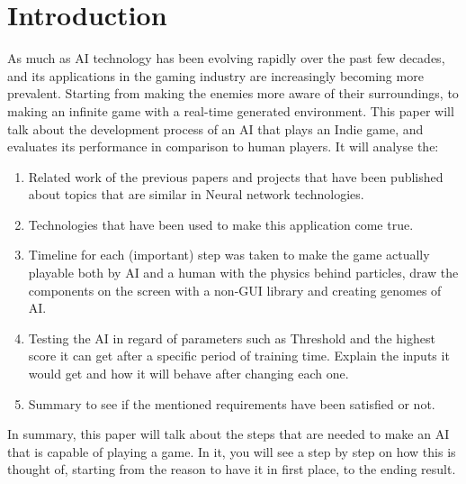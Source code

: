 \chapter{Introduction}
As much as AI technology has been evolving rapidly over the past few decades, and its applications in the gaming industry are increasingly becoming more prevalent. Starting from making the enemies more aware of their surroundings, to making an infinite game with a real-time generated environment. This paper will talk about the development process of an AI that plays an Indie game, and evaluates its performance in comparison to human players. It will analyse the:

\begin{enumerate}
\item Related work of the previous papers and projects that have been published about topics that are similar in Neural network technologies.
\item Technologies that have been used to make this application come true.
\item Timeline for each (important) step was taken to make the game actually playable both by AI and a human with the physics behind particles, draw the components on the screen with a non-GUI library and creating genomes of AI.
\item Testing the AI in regard of parameters such as Threshold and the highest score it can get after a specific period of training time. Explain the inputs it would get and how it will behave after changing each one.
\item Summary to see if the mentioned requirements have been satisfied or not.
\end{enumerate}

In summary, this paper will talk about the steps that are needed to make an AI that is capable of playing a game. In it, you will see a step by step on how this is thought of, starting from the reason to have it in first place, to the ending result.

